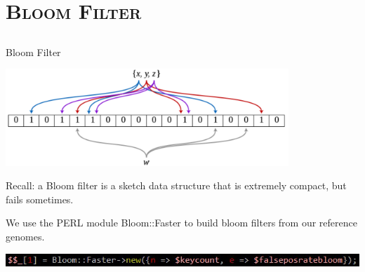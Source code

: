 \documentclass[xcolor=x11names,compress]{beamer}
\renewcommand{\(}{\begin{columns}}
\renewcommand{\)}{\end{columns}}
\newcommand{\<}[1]{\begin{column}{#1}}
\renewcommand{\>}{\end{column}}
\begin{document}
\section{\scshape Bloom Filter}
\subsection{}
\begin{frame}{Bloom Filter}
\begin{center}
         \includegraphics[width=0.8\textwidth, height=0.3\textwidth]{Bloom_filter.png}\\
\end{center}
Recall: a Bloom filter is a sketch data structure that is extremely compact, but fails sometimes.
\par
We use the PERL module Bloom::Faster to build bloom filters from our reference genomes.
\begin{center}
         \includegraphics[width=1\textwidth, height=0.05\textwidth]{bloomfaster.png}\\
\end{center}
\end{frame}
\end{document}
